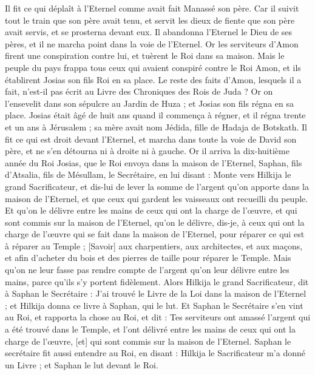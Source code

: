 \begin{multicols}{2}
Il fit ce qui déplaît à l'Eternel comme avait fait Manassé son père.
Car il suivit tout le train que son père avait tenu, et servit les dieux de fiente que son père avait servis, et se prosterna devant eux.
Il abandonna l'Eternel le Dieu de ses pères, et il ne marcha point dans la voie de l'Eternel.
Or les serviteurs d'Amon firent une conspiration contre lui, et tuèrent le Roi dans sa maison.
Mais le peuple du pays frappa tous ceux qui avaient conspiré contre le Roi Amon, et ils établirent Josias son fils Roi en sa place.
Le reste des faits d'Amon, lesquels il a fait, n'est-il pas écrit au Livre des Chroniques des Rois de Juda ?
Or on l'ensevelit dans son sépulcre au Jardin de Huza ; et Josias son fils régna en sa place.
\VerseOne{}Josias était âgé de huit ans quand il commença à régner, et il régna trente et un ans à Jérusalem ; sa mère avait nom Jédida, fille de Hadaja de Botskath.
Il fit ce qui est droit devant l'Eternel, et marcha dans toute la voie de David son père, et ne s'en détourna ni à droite ni à gauche.
Or il arriva la dix-huitième année du Roi Josias, que le Roi envoya dans la maison de l'Eternel, Saphan, fils d'Atsalia, fils de Mésullam, le Secrétaire, en lui disant :
Monte vers Hilkija le grand Sacrificateur, et dis-lui de lever la somme de l'argent qu'on apporte dans la maison de l'Eternel, et que ceux qui gardent les vaisseaux ont recueilli du peuple.
Et qu'on le délivre entre les mains de ceux qui ont la charge de l'œuvre, et qui sont commis sur la maison de l'Eternel, qu'on le délivre, dis-je, à ceux qui ont la charge de l'œuvre qui se fait dans la maison de l'Eternel, pour réparer ce qui est à réparer au Temple ;
[Savoir] aux charpentiers, aux architectes, et aux maçons, et afin d'acheter du bois et des pierres de taille pour réparer le Temple.
Mais qu'on ne leur fasse pas rendre compte de l'argent qu'on leur délivre entre les mains, parce qu'ils s'y portent fidèlement.
Alors Hilkija le grand Sacrificateur, dit à Saphan le Secrétaire : J'ai trouvé le Livre de la Loi dans la maison de l'Eternel ; et Hilkija donna ce livre à Saphan, qui le lut.
Et Saphan le Secrétaire s'en vint au Roi, et rapporta la chose au Roi, et dit : Tes serviteurs ont amassé l'argent qui a été trouvé dans le Temple, et l'ont délivré entre les mains de ceux qui ont la charge de l'œuvre, [et] qui sont commis sur la maison de l'Eternel.
Saphan le secrétaire fit aussi entendre au Roi, en disant : Hilkija le Sacrificateur m'a donné un Livre ; et Saphan le lut devant le Roi.

\end{multicols}

